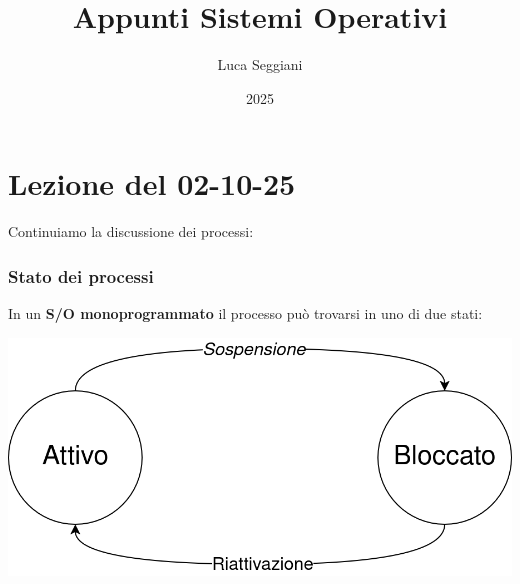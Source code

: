 \documentclass[a4paper,11pt]{article}
\title{Appunti Sistemi Operativi}
\author{Luca Seggiani}
\date{2025}
\begin{document}
\section{Lezione del 02-10-25}

\thispagestyle{empty}
\pagestyle{fancy}

Continuiamo la discussione dei processi:

\subsubsection{Stato dei processi}
In un \textbf{S/O monoprogrammato} il processo può trovarsi in uno di due stati:

\begin{center}
	\includegraphics[scale=0.25]{../figures/proc_attivo_bloccato.png}
\end{center}
\end{document}
